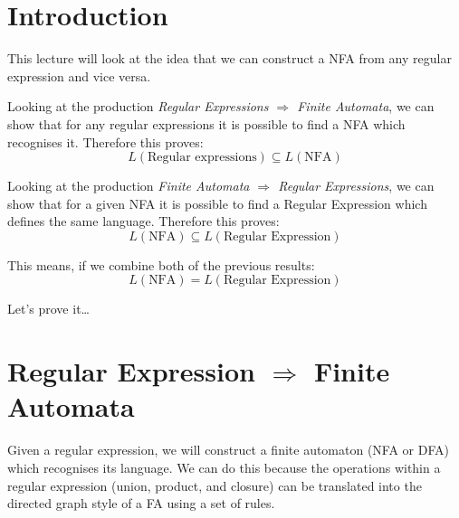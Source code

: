 
\section{Introduction}
This lecture will look at the idea that we can construct a NFA from any regular expression and vice versa.

Looking at the production \textit{Regular Expressions $\Rightarrow$ Finite Automata}, we can show that for any regular expressions it is possible to find a NFA which recognises it. Therefore this proves:
\[L(\textrm{Regular\ expressions}) \subseteq L(\textrm{NFA})\]

Looking at the production \textit{Finite Automata $\Rightarrow$ Regular Expressions}, we can show that for a given NFA it is possible to find a Regular Expression which defines the same language. Therefore this proves:
\[L(\textrm{NFA}) \subseteq L(\textrm{Regular\ Expression})\]

This means, if we combine both of the previous results:
\[L(\textrm{NFA}) = L(\textrm{Regular\ Expression})\]

Let's prove it\ldots

\section{Regular Expression $\Rightarrow$ Finite Automata}
Given a regular expression, we will construct a finite automaton (NFA or DFA) which recognises its language. We can do this because the operations within a regular expression (union, product, and closure) can be translated into the directed graph style of a FA using a set of rules.

